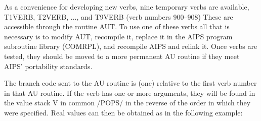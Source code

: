 As a convenience for developing new verbs, nine temporary verbs are
available, T1VERB, T2VERB, ..., and T9VERB (verb numbers 900--908)
These are accessible through the routine AUT.  To use one of these
verbs all that is necessary is to modify AUT, recompile it, replace it
in the AIPS program subroutine library (COMRPL), and recompile AIPS
and relink it. Once verbs are tested, they should be moved to a more
permanent AU routine if they meet AIPS' portability standards.

The branch code sent to the AU routine is (one) relative to the first
verb number in that AU routine.  If the verb has one or more
arguments, they will be found in the value stack V in common /POPS/ in
the reverse of the order in which they were specified.  Real values
can then be obtained as in the following example:

